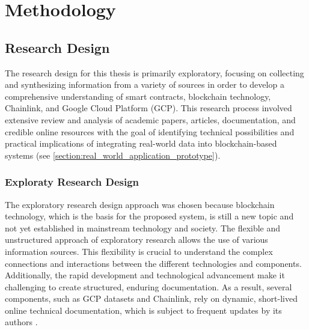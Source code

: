 \chapter{Methodology}\label{chapter:methodology}
\section{Research Design}\label{section:research_design}

The research design for this thesis is primarily exploratory, focusing on collecting and synthesizing information from a variety of sources in order to develop a comprehensive understanding of smart contracts, blockchain technology, Chainlink, and Google Cloud Platform (GCP). This research process involved extensive review and analysis of academic papers, articles, documentation, and credible online resources with the goal of identifying technical possibilities and practical implications of integrating real-world data into blockchain-based systems (see \cref{section:real_world_application_prototype}).

\subsection{Exploraty Research Design}
The exploratory research design approach was chosen because blockchain technology, which is the basis for the proposed system, is still a new topic and not yet established in mainstream technology and society. The flexible and unstructured approach of exploratory research allows the use of various information sources. This flexibility is crucial to understand the complex connections and interactions between the different technologies and components. Additionally, the rapid development and technological advancement make it challenging to create structured, enduring documentation. As a result, several components, such as GCP datasets and Chainlink, rely on dynamic, short-lived online technical documentation, which is subject to frequent updates by its authors \autocite{kicsi2022exploratory}.

